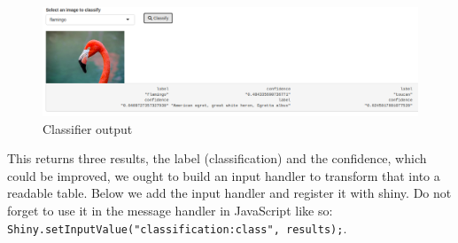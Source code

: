 \documentclass[
]{krantz}
\makeatletter
\newenvironment{Shaded}{\begin{snugshade}}{\end{snugshade}}
\newcommand{\CommentTok}[1]{\textcolor[rgb]{0.37,0.37,0.37}{\textit{#1}}}
\newcommand{\ControlFlowTok}[1]{\textcolor[rgb]{0.27,0.27,0.27}{\textbf{#1}}}
\newcommand{\DataTypeTok}[1]{\textcolor[rgb]{0.27,0.27,0.27}{#1}}
\newcommand{\KeywordTok}[1]{\textcolor[rgb]{0.27,0.27,0.27}{\textbf{#1}}}
\newcommand{\NormalTok}[1]{#1}
\newcommand{\OperatorTok}[1]{\textcolor[rgb]{0.43,0.43,0.43}{\textbf{#1}}}
\newcommand{\StringTok}[1]{\textcolor[rgb]{0.5,0.5,0.5}{#1}}
\newenvironment{kframe}{%
\medskip{}
\setlength{\fboxsep}{.8em}
 \def\at@end@of@kframe{}%
 \ifinner\ifhmode%
  \def\at@end@of@kframe{\end{minipage}}%
  \begin{minipage}{\columnwidth}%
 \fi\fi%
 \def\FrameCommand##1{\hskip\@totalleftmargin \hskip-\fboxsep
 \colorbox{shadecolor}{##1}\hskip-\fboxsep
     \hskip-\linewidth \hskip-\@totalleftmargin \hskip\columnwidth}%
 \MakeFramed {\advance\hsize-\width
   \@totalleftmargin\z@ \linewidth\hsize
   \@setminipage}}%
 {\par\unskip\endMakeFramed%
 \at@end@of@kframe}
\renewenvironment{Shaded}{\begin{kframe}}{\end{kframe}}
\makeatother
\begin{document}
\begin{Shaded}
\end{Shaded}

\begin{figure}
\centering
\includegraphics{images/ml5-output.png}
\caption{Classifier output}
\end{figure}

This returns three results, the label (classification) and the confidence, which could be improved, we ought to build an input handler to transform that into a readable table. Below we add the input handler and register it with shiny. Do not forget to use it in the message handler in JavaScript like so: \texttt{Shiny.setInputValue("classification:class",\ results);}.
\end{document}
